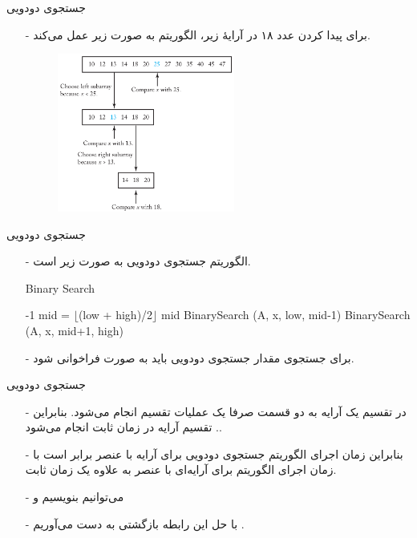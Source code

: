 \begin{frame}{‌جستجوی دودویی}
\begin{itemize}\itemr
\item[-]
برای پیدا کردن عدد ۱۸ در آرایهٔ زیر، الگوریتم به صورت زیر عمل می‌کند.
\begin{figure}
\includegraphics[width=0.55\textwidth]{figs/chap03/binarysearch2-1}
\end{figure}
\end{itemize}
\end{frame}


\begin{frame}{‌جستجوی دودویی}
\begin{itemize}\itemr
\item[-]
الگوریتم جستجوی دودویی به صورت زیر است.
\begin{algorithm}[H]\alglr
  \caption{‌Binary Search} 
  \begin{algorithmic}[1]
        \State \Return -‌1
    \EndIf
    \State mid = $\lfloor$(low + high)/2$\rfloor$
         \State \Return mid
     \EndIf
          \State \Return BinarySearch (A, x, low, mid-1)
      \Else
          \State \Return BinarySearch (A, x, mid+1, high)
      \EndIf                          
  \end{algorithmic}
  \label{alg:merge}
\end{algorithm}
\item[-]
برای جستجوی مقدار
جستجوی دودویی باید به صورت
فراخوانی شود.
\end{itemize}
\end{frame}



\begin{frame}{‌جستجوی دودویی}
\begin{itemize}\itemr
\item[-]
در تقسیم یک آرایه به دو قسمت صرفا یک عملیات تقسیم انجام می‌شود. بنابراین
. تقسیم آرایه در زمان ثابت انجام می‌شود.
\item[-]
بنابراین زمان اجرای الگوریتم جستجوی دودویی برای آرایه با
عنصر برابر است با زمان اجرای الگوریتم برای آرایه‌ای با
عنصر به علاوه یک زمان ثابت.
\item[-]
می‌توانیم بنویسیم
و
\item[-]
با حل این رابطه بازگشتی به دست می‌آوریم
.
\end{itemize}
\end{frame}
